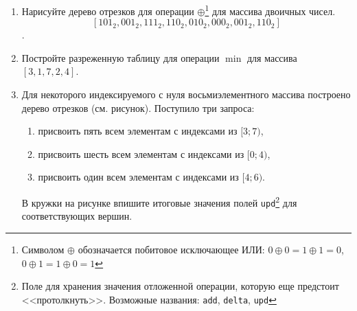\documentclass[a4paper,10pt]{article}
\begin{document}
  \begin{enumerate}
    \item Нарисуйте дерево отрезков для операции
      $\oplus$\footnote{Символом $\oplus$ обозначается побитовое исключающее ИЛИ:
      $0 \oplus 0 = 1 \oplus 1 = 0$, $0 \oplus 1 = 1 \oplus 0 = 1$}
      для массива двоичных чисел.
      $$[101_2, 001_2, 111_2, 110_2, 010_2, 000_2, 001_2, 110_2]$$.

      \vskip 3cm

    \item Постройте разреженную таблицу для операции $\min$
      для массива $[3, 1, 7, 2, 4]$.

      \vskip 3cm

    \item Для некоторого индексируемого с нуля восьмиэлементного
      массива построено дерево отрезков (см. рисунок).
      Поступило три запроса:
      \begin{enumerate} 
        \item присвоить пять всем элементам с индексами из $[3;7)$,
        \item присвоить шесть всем элементам с индексами из $[0;4)$,
        \item присвоить один всем элементам с индексами из $[4; 6)$.
      \end{enumerate}

      В кружки на рисунке впишите итоговые значения полей
      \texttt{upd}\footnote{Поле для хранения значения отложенной операции, которую еще
      предстоит <<протолкнуть>>. Возможные названия: \texttt{add}, \texttt{delta}, \texttt{upd}}
      для соответствующих вершин.

      \begin{center}
      \end{center}


\end{enumerate}
\end{document}
